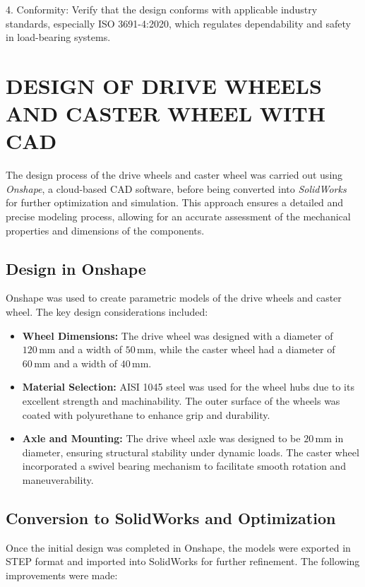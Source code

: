 \documentclass[../../main]{subfiles}
\begin{document}
4. Conformity: Verify that the design conforms with applicable industry
standards, especially ISO 3691-4:2020, which regulates dependability and
safety in load-bearing systems.

\section{DESIGN OF DRIVE WHEELS AND CASTER WHEEL  WITH  CAD}
The design process of the drive wheels and caster wheel was carried out using \emph{Onshape}, a cloud-based CAD software, before being converted into \emph{SolidWorks} for further optimization and simulation. This approach ensures a detailed and precise modeling process, allowing for an accurate assessment of the mechanical properties and dimensions of the components.

\subsection{Design in Onshape}
Onshape was used to create parametric models of the drive wheels and caster wheel. The key design considerations included:
\begin{itemize}

\item \textbf{Wheel Dimensions:} The drive wheel was designed with a diameter of $120 \, \mathrm{mm}$ and a width of $50 \, \mathrm{mm}$, while the caster wheel had a diameter of $60 \, \mathrm{mm}$ and a width of $40 \, \mathrm{mm}$.
  
\item \textbf{Material Selection:} AISI 1045 steel was used for the wheel hubs due to its excellent strength and machinability. The outer surface of the wheels was coated with polyurethane to enhance grip and durability.
  
\item \textbf{Axle and Mounting:} The drive wheel axle was designed to be $20 \, \mathrm{mm}$ in diameter, ensuring structural stability under dynamic loads. The caster wheel incorporated a swivel bearing mechanism to facilitate smooth rotation and maneuverability.
  
\end{itemize}

\subsection{Conversion to SolidWorks and Optimization}
Once the initial design was completed in Onshape, the models were exported in STEP format and imported into SolidWorks for further refinement. The following improvements were made:
\end{document}
